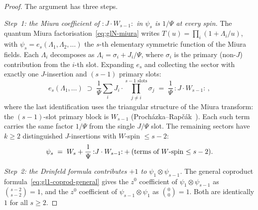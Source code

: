 \documentclass[11pt,reqno]{amsart}
\theoremstyle{definition}
\theoremstyle{remark}
\numberwithin{equation}{section}
\begin{document}
\begin{proof}
The argument has three steps.

\emph{Step~1: the Miura coefficient of
${:}J \cdot W_{s-1}{:}$ in $\psi_s$ is $1/\Psi$
at every spin.}
The quantum Miura
factorisation~\eqref{eq:glN-miura}
writes
$T(u) = \prod_{i}(1 + \Lambda_i/u)$, with
$\psi_s = e_s(\Lambda_1, \Lambda_2, \ldots)$
the $s$-th elementary symmetric function of the
Miura fields. Each $\Lambda_i$ decomposes as
$\Lambda_i = \sigma_i + J_i/\Psi$, where
$\sigma_i$ is the primary \textup{(}non-$J$\textup{)}
contribution from the $i$-th slot.
Expanding $e_s$ and collecting the sector with exactly
one $J$-insertion and $(s - 1)$ primary slots:
\[
  e_s(\Lambda_1, \ldots)
  \;\supset\;
  \frac{1}{\Psi}
  \sum_{i}
  J_i \cdot \prod_{\substack{j \neq i}}^{s-1\text{ slots}}
  \sigma_j
  \;=\;
  \frac{1}{\Psi}\,{:}J \cdot W_{s-1}{:}\,,
\]
where the last identification uses the triangular
structure of the Miura transform: the $(s-1)$-slot
primary block is $W_{s-1}$
\textup{(}Proch\'azka--Rap\v{c}\'ak~\cite{PR19}\textup{)}.
Each such term carries the same factor $1/\Psi$
from the single $J/\Psi$ slot.
The remaining sectors have $k \geq 2$ distinguished
$J$-insertions with $W$-spin $\leq s - 2$:
\begin{equation}\label{eq:miura-triangular}
  \psi_s
  \;=\;
  W_s + \frac{1}{\Psi}\,{:}J \cdot W_{s-1}{:}
  + (\textup{terms of $W$-spin $\leq s-2$}).
\end{equation}

\emph{Step~2: the Drinfeld formula contributes $+1$ to
$\psi_1 \otimes \psi_{s-1}$.}
The general coproduct
formula~\eqref{eq:gl1-coprod-general} gives the
$z^0$ coefficient of $\psi_1 \otimes \psi_{s-1}$ as
$\binom{s - 2}{s - 2} = 1$, and the $z^0$ coefficient
of $\psi_{s-1} \otimes \psi_1$ as
$\binom{0}{0} = 1$. Both are identically $1$ for all
$s \geq 2$.


\end{proof}
\end{document}
